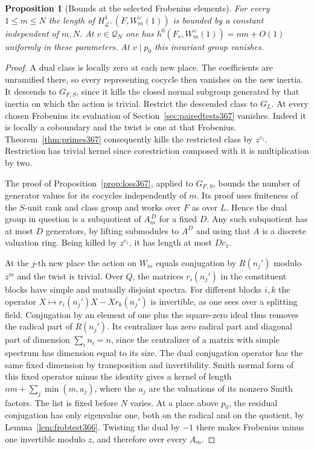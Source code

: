 \documentclass[a4paper,11pt]{article}
\newtheorem{proposition}{Proposition}[section]
\theoremstyle{definition}
\theoremstyle{remark}
\numberwithin{equation}{section}
\begin{document}
\begin{proposition}[Bounds at the selected Frobenius elements]
\label{prop:testbounds368}
For every \(1\le m\le N\) the length of
\(H^1_{\mathcal L^\perp}(F,W_m^\vee(1))\) is bounded by a
constant independent of \(m,N\). At \(v\in\mathcal Q_N\)
one has \(h^0(F_v,W_m^\vee(1))=nm+O(1)\) uniformly in these
parameters. At \(v\mid p_0\) this invariant group vanishes.
\end{proposition}
\begin{proof}
A dual class is locally zero at each new place. The coefficients
are unramified there, so every representing cocycle then vanishes
on the new inertia. It descends to \(G_{F,S}\), since it kills
the closed normal subgroup generated by that inertia on which
the action is trivial. Restrict the descended class to \(G_L\).
At every chosen Frobenius its evaluation of
Section~\ref{sec:pairedtests367} vanishes. Indeed it is locally
a coboundary and the twist is one at that Frobenius.
Theorem~\ref{thm:primes367} consequently kills the restricted
class by \(z^{c_1}\). Restriction has trivial kernel since
corestriction composed with it is multiplication by two.

The proof of Proposition~\ref{prop:loss367}, applied to
\(G_{F,S}\), bounds the number of generator values for its
cocycles independently of \(m\). Its proof uses finiteness
of the \(S\)-unit rank and class group and works over \(F\)
as over \(L\). Hence the dual group in question is a
subquotient of \(A_m^{\,D}\) for a fixed \(D\). Any such
subquotient has at most \(D\) generators, by lifting
submodules to \(A^D\) and using that \(A\) is a discrete
valuation ring. Being killed by \(z^{c_1}\), it has length
at most \(Dc_1\).

At the \(j\)-th new place the action on \(W_m\) equals
conjugation by \(R(n_j')\) modulo \(z^m\) and the twist is
trivial. Over \(Q\), the matrices \(r_i(n_j')\) in the
constituent blocks have simple and mutually disjoint spectra.
For different blocks \(i,k\) the operator
\(X\mapsto r_i(n_j')X-Xr_k(n_j')\) is invertible, as one
sees over a splitting field. Conjugation by an element of
one plus the square-zero ideal thus removes the radical
part of \(R(n_j')\). Its centralizer has zero radical part
and diagonal part of dimension \(\sum_i n_i=n\), since the
centralizer of a matrix with simple spectrum has dimension
equal to its size. The dual conjugation operator has the same
fixed dimension by transposition and invertibility.
Smith normal form of this fixed operator minus the identity
gives a kernel of length \(nm+\sum_j\min(m,a_j)\), where
the \(a_j\) are the valuations of its nonzero Smith factors.
The list is fixed before \(N\) varies. At a place above
\(p_0\), the residual conjugation has only eigenvalue one,
both on the radical and on the quotient, by
Lemma~\ref{lem:frobtest366}. Twisting the dual by \(-1\)
there makes Frobenius minus one invertible modulo \(z\),
and therefore over every \(A_m\).
\end{proof}
\end{document}
